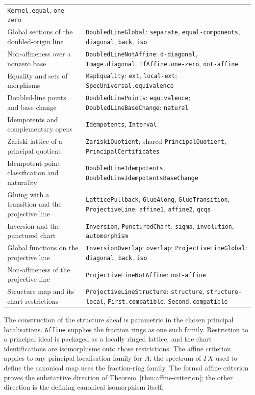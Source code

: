 \documentclass[11pt]{amsart}
\theoremstyle{definition}
\theoremstyle{remark}
\begin{document}
\begin{longtable}{@{}>{\raggedright\arraybackslash}p{}>{\raggedright\arraybackslash}p{}@{}}
\texttt{Kernel.equal}, \texttt{one-zero}\\[4pt]
Global sections of the doubled-origin line&
\texttt{DoubledLineGlobal}: \texttt{separate},
\texttt{equal-components}, \texttt{diagonal},
\texttt{back}, \texttt{iso}\\[4pt]
Non-affineness over a nonzero base&
\texttt{DoubledLineNotAffine}: \texttt{d-diagonal},
\texttt{Image.diagonal}, \texttt{IfAffine.one-zero},
\texttt{not-affine}\\[4pt]
Equality and sets of morphisms&
\texttt{MapEquality}: \texttt{ext}, \texttt{local-ext};
\texttt{SpecUniversal.equivalence}\\[4pt]
Doubled-line points and base change&
\texttt{DoubledLinePoints}: \texttt{equivalence};
\texttt{DoubledLineBaseChange}: \texttt{natural}\\[4pt]
Idempotents and complementary opens&
\texttt{Idempotents}, \texttt{Interval}\\[4pt]
Zariski lattice of a principal quotient&
\texttt{ZariskiQuotient}; shared
\texttt{PrincipalQuotient}, \texttt{PrincipalCertificates}\\[4pt]
Idempotent point classification and naturality&
\texttt{DoubledLineIdempotents},
\texttt{DoubledLineIdempotentsBaseChange}\\[4pt]
Gluing with a transition and the projective line&
\texttt{LatticePullback}, \texttt{GlueAlong},
\texttt{GlueTransition}, \texttt{ProjectiveLine}:
\texttt{affine1}, \texttt{affine2}, \texttt{qcqs}\\[4pt]
Inversion and the punctured chart&
\texttt{Inversion}, \texttt{PuncturedChart}:
\texttt{sigma}, \texttt{involution}, \texttt{automorphism}\\[4pt]
Global functions on the projective line&
\texttt{InversionOverlap}: \texttt{overlap};
\texttt{ProjectiveLineGlobal}: \texttt{diagonal}, \texttt{back},
\texttt{iso}\\[4pt]
Non-affineness of the projective line&
\texttt{ProjectiveLineNotAffine}: \texttt{not-affine}\\[4pt]
Structure map and its chart restrictions&
\texttt{ProjectiveLineStructure}: \texttt{structure},
\texttt{structure-local}, \texttt{First.compatible},
\texttt{Second.compatible}\\
\end{longtable}
\normalsize

The construction of the structure sheaf is parametric in the chosen
principal localisations. \texttt{Affine} supplies the fraction rings as
one such family. Restriction to a principal ideal is packaged as a locally
ringed lattice, and the chart identifications are isomorphisms onto those
restrictions. The affine criterion applies to any principal localisation
family for $A$; the spectrum of $\Gamma X$ used to define the canonical
map uses the fraction-ring family. The formal affine criterion proves the
substantive direction of Theorem~\ref{thm:affine-criterion}; the other
direction is the defining canonical isomorphism itself.
\end{document}
